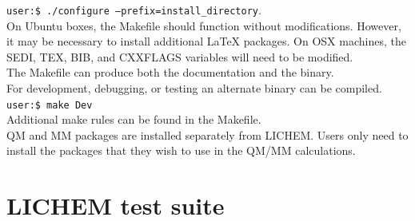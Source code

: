 \documentclass[12pt]{report}
\begin{document}
\texttt{user:\$ ./configure --prefix=install_directory}.\\




On Ubuntu boxes, the Makefile should function without modifications.
However, it may be necessary to install additional LaTeX packages.
On OSX machines, the SEDI, TEX, BIB, and CXXFLAGS variables will need to be
modified. \\

The Makefile can produce both the documentation and the binary. \\

For development, debugging, or testing an alternate binary can be compiled. \\

\texttt{user:\$ make Dev} \\

Additional make rules can be found in the Makefile. \\

QM and MM packages are installed separately from LICHEM.
Users only need to install the packages that they wish to use in the
QM/MM calculations.

\section{LICHEM test suite}
\end{document}
